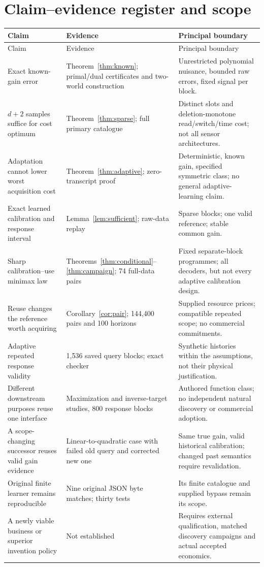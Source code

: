 \documentclass[11pt,letterpaper]{article}
\theoremstyle{definition}\newtheorem{definition}[theorem]{Definition}
\theoremstyle{remark}\newtheorem{remark}[theorem]{Remark}
\begin{document}
\section{Claim--evidence register and scope}
\label{app:claims}
\small
\begin{longtable}{@{}P{.28\linewidth}P{.34\linewidth}P{.32\linewidth}@{}}\toprule
Claim & Evidence & Principal boundary\\\midrule\endfirsthead
\toprule Claim & Evidence & Principal boundary\\\midrule\endhead
Exact known-gain error & Theorem~\ref{thm:known}; primal/dual certificates and two-world construction & Unrestricted polynomial nuisance, bounded raw errors, fixed signal per block.\\[4pt]
$d+2$ samples suffice for cost optimum & Theorem~\ref{thm:sparse}; full primary catalogue & Distinct slots and deletion-monotone read/switch/time cost; not all sensor architectures.\\[4pt]
Adaptation cannot lower worst acquisition cost & Theorem~\ref{thm:adaptive}; zero-transcript proof & Deterministic, known gain, specified symmetric class; no general adaptive-learning claim.\\[4pt]
Exact learned calibration and response interval & Lemma~\ref{lem:sufficient}; raw-data replay & Sparse blocks; one valid reference; stable common gain.\\[4pt]
Sharp calibration--use minimax law & Theorems~\ref{thm:conditional}--\ref{thm:campaign}; 74 full-data pairs & Fixed separate-block programmes; all decoders, but not every adaptive calibration design.\\[4pt]
Reuse changes the reference worth acquiring & Corollary~\ref{cor:pair}; 144,400 pairs and 100 horizons & Supplied resource prices; compatible repeated scope; no commercial commitments.\\[4pt]
Adaptive repeated response validity & 1,536 saved query blocks; exact checker & Synthetic histories within the assumptions, not their physical justification.\\[4pt]
Different downstream purposes reuse one interface & Maximization and inverse-target studies, 800 response blocks & Authored function class; no independent natural discovery or commercial adoption.\\[4pt]
A scope-changing successor reuses valid gain evidence & Linear-to-quadratic case with failed old query and corrected new one & Same true gain, valid historical calibration; changed past semantics require revalidation.\\[4pt]
Original finite learner remains reproducible & Nine original JSON byte matches; thirty tests & Its finite catalogue and supplied bypass remain its scope.\\[4pt]
A newly viable business or superior invention policy & Not established & Requires external qualification, matched discovery campaigns and actual accepted economics.\\\bottomrule
\end{longtable}
\normalsize
\end{document}
